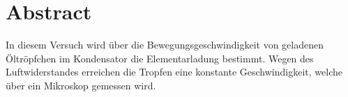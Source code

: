 \section{Abstract}
\label{sec:Abstract}
In diesem Versuch wird über die Bewegungsgeschwindigkeit von geladenen Öltröpfchen im Kondensator die Elementarladung bestimmt. Wegen des Luftwiderstandes erreichen die Tropfen eine konstante Geschwindigkeit, welche über ein Mikroskop gemessen wird.
